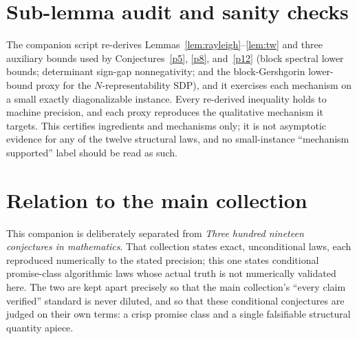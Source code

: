 \documentclass[11pt]{article}
\theoremstyle{definition}
\begin{document}
\section{Sub-lemma audit and sanity checks}
The companion script re-derives Lemmas~\ref{lem:rayleigh}--\ref{lem:tw} and three
auxiliary bounds used by Conjectures~\ref{p5}, \ref{p8}, and~\ref{p12} (block
spectral lower bounds; determinant sign-gap nonnegativity; and the block-Gershgorin
lower-bound proxy for the $N$-representability SDP), and it exercises each
mechanism on a small exactly diagonalizable instance.  Every re-derived inequality
holds to machine precision, and each proxy reproduces the qualitative mechanism it
targets.  This certifies ingredients and mechanisms only; it is not asymptotic
evidence for any of the twelve structural laws, and no small-instance ``mechanism
supported'' label should be read as such.

\section*{Relation to the main collection}
This companion is deliberately separated from \emph{Three hundred nineteen
conjectures in mathematics}.  That collection states exact, unconditional laws,
each reproduced numerically to the stated precision; this one states conditional
promise-class algorithmic laws whose actual truth is not numerically validated
here.  The two are kept apart precisely so that the main collection's ``every
claim verified'' standard is never diluted, and so that these conditional
conjectures are judged on their own terms: a crisp promise class and a single
falsifiable structural quantity apiece.
\end{document}
